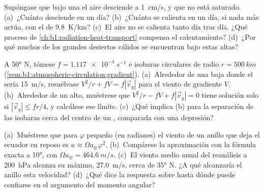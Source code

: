 \begin{exercise}[$\star\star$]\label{exo:b1:atmospheric-circulation:9}
Supóngase que bajo una  el aire desciende a \qty{1}{cm/s}, y que no está saturado. (a)~¿Cuánto desciende en un día? (b)~¿Cuánto se calienta en un día, si nada más actúa, con el  de \qty{9.8}{K/km}? (c)~El aire no se calienta tanto día tras día. ¿Qué proceso de \cref{ch:b1:radiation-heat-transport} compensa el calentamiento? (d)~¿Por qué muchos de los grandes desiertos cálidos se encuentran bajo estas altas?
\end{exercise}

\begin{exercise}[$\star\star\star$]\label{exo:b1:atmospheric-circulation:10}
A \ang{50} N, tómese $f = \qty{1.117e-4}{s^{-1}}$ e isobaras circulares de radio
$r = \qty{500}{km}$ (\cref{rem:b1:atmospheric-circulation:gradient}). (a)~Alrededor de una baja donde el  sería \qty{15}{m/s}, resuélvase $V^2/r + fV =
f|\vec v_g|$ para el viento de gradiente $V$. (b)~Alrededor de un alto, muéstrese que $V^2/r - fV + f
|\vec v_g| = 0$ tiene solución solo si $|\vec v_g| \leq fr/4$, y calcúlese ese límite. (c)~¿Qué implica (b) para la separación de las isobaras cerca del centro de un , comparada con una depresión?
\end{exercise}

\begin{exercise}[$\star\star\star$]\label{exo:b1:atmospheric-circulation:11}
(a)~Muéstrese que para $\varphi$ pequeño (en radianes) el viento de un anillo que deja el ecuador en reposo es $u \approx \Omega a_\oplus\varphi^2$. (b)~Compárese la aproximación con la fórmula exacta a \ang{10}, con $\Omega a_\oplus = \qty{464.6}{m/s}$. (c)~El viento medio anual del reanálisis a \qty{200}{hPa} alcanza su máximo, \qty{27.0}{m/s}, cerca de \ang{35} N. ¿A qué  alcanzaría el anillo esta velocidad? (d)~¿Qué dice la respuesta sobre hasta dónde puede confiarse en el argumento del momento angular?
\end{exercise}

